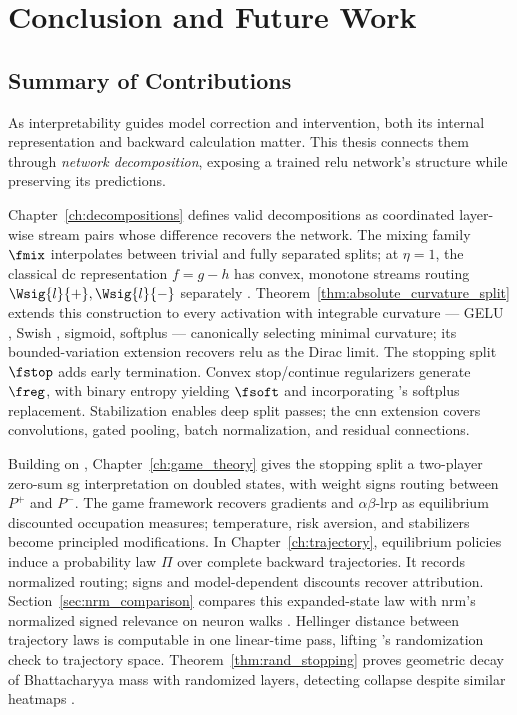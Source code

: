 \chapter{Conclusion and Future Work}\label{ch:conclusion}

\section{Summary of Contributions}\label{sec:summary_contributions}

As interpretability guides model correction and intervention, both its internal representation and backward calculation matter. This thesis connects them through \emph{network decomposition}, exposing a trained \ac{relu} network's structure while preserving its predictions.

Chapter~\ref{ch:decompositions} defines valid decompositions as coordinated layer-wise stream pairs whose difference recovers the network. The mixing family $\fmix$ interpolates between trivial and fully separated splits; at $\eta = 1$, the classical \ac{dc} representation $f = g - h$ has convex, monotone streams routing $\Wsig{l}{+}, \Wsig{l}{-}$ separately \parencite{hiddenMono}. Theorem~\ref{thm:absolute_curvature_split} extends this construction to every activation with integrable curvature --- GELU \parencite{Hendrycks2016}, Swish \parencite{Ramachandran2017_swish}, sigmoid, softplus --- canonically selecting minimal curvature; its bounded-variation extension recovers \ac{relu} as the Dirac limit. The stopping split $\fstop$ adds early termination. Convex stop/continue regularizers generate $\freg$, with binary entropy yielding $\fsoft$ and incorporating \textcite{Dombrowski2020}'s softplus replacement. Stabilization enables deep split passes; the \ac{cnn} extension covers convolutions, gated pooling, batch normalization, and residual connections.

Building on \textcite{Gaubert2025}, Chapter~\ref{ch:game_theory} gives the stopping split a two-player zero-sum \ac{sg} interpretation on doubled states, with weight signs routing between $P^+$ and $P^-$. The game framework recovers gradients and $\alpha\beta$-\ac{lrp} as equilibrium discounted occupation measures; temperature, risk aversion, and stabilizers become principled modifications. In Chapter~\ref{ch:trajectory}, equilibrium policies induce a probability law $\Pi$ over complete backward trajectories. It records normalized routing; signs and model-dependent discounts recover attribution. Section~\ref{sec:nrm_comparison} compares this expanded-state law with \ac{nrm}'s normalized signed relevance on neuron walks \parencite{Xiong2026nrm}. Hellinger distance between trajectory laws is computable in one linear-time pass, lifting \textcite{Adebayo2018sanity}'s randomization check to trajectory space. Theorem~\ref{thm:rand_stopping} proves geometric decay of Bhattacharyya mass with randomized layers, detecting collapse despite similar heatmaps \parencite{sixt2020whenexplanationslie}.

